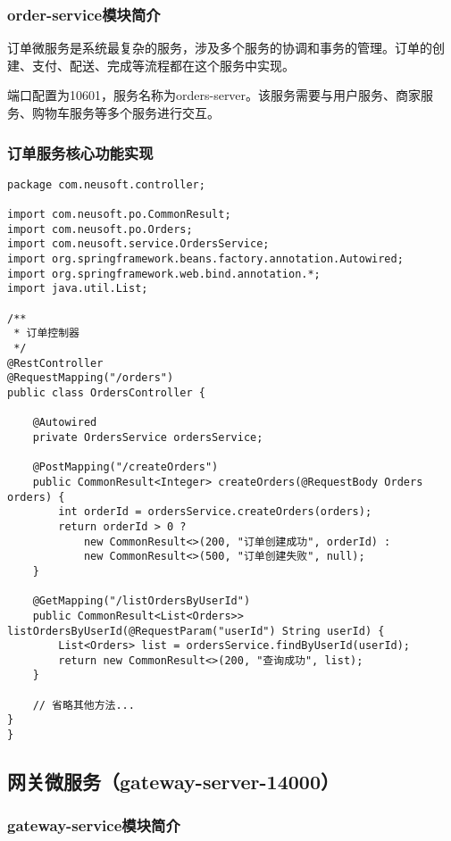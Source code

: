 \documentclass[a4paper,12pt]{article}
\begin{document}
\subsubsection{order-service模块简介}

订单微服务是系统最复杂的服务，涉及多个服务的协调和事务的管理。订单的创建、支付、配送、完成等流程都在这个服务中实现。

端口配置为10601，服务名称为orders-server。该服务需要与用户服务、商家服务、购物车服务等多个服务进行交互。

\subsubsection{订单服务核心功能实现}

\begin{lstlisting}[caption=订单控制器实现]
package com.neusoft.controller;

import com.neusoft.po.CommonResult;
import com.neusoft.po.Orders;
import com.neusoft.service.OrdersService;
import org.springframework.beans.factory.annotation.Autowired;
import org.springframework.web.bind.annotation.*;
import java.util.List;

/**
 * 订单控制器
 */
@RestController
@RequestMapping("/orders")
public class OrdersController {
    
    @Autowired
    private OrdersService ordersService;
    
    @PostMapping("/createOrders")
    public CommonResult<Integer> createOrders(@RequestBody Orders orders) {
        int orderId = ordersService.createOrders(orders);
        return orderId > 0 ?
            new CommonResult<>(200, "订单创建成功", orderId) :
            new CommonResult<>(500, "订单创建失败", null);
    }
    
    @GetMapping("/listOrdersByUserId")
    public CommonResult<List<Orders>> listOrdersByUserId(@RequestParam("userId") String userId) {
        List<Orders> list = ordersService.findByUserId(userId);
        return new CommonResult<>(200, "查询成功", list);
    }
    
    // 省略其他方法...
}
}
\end{lstlisting}

\subsection{网关微服务（gateway-server-14000）}

\subsubsection{gateway-service模块简介}
\end{document}

